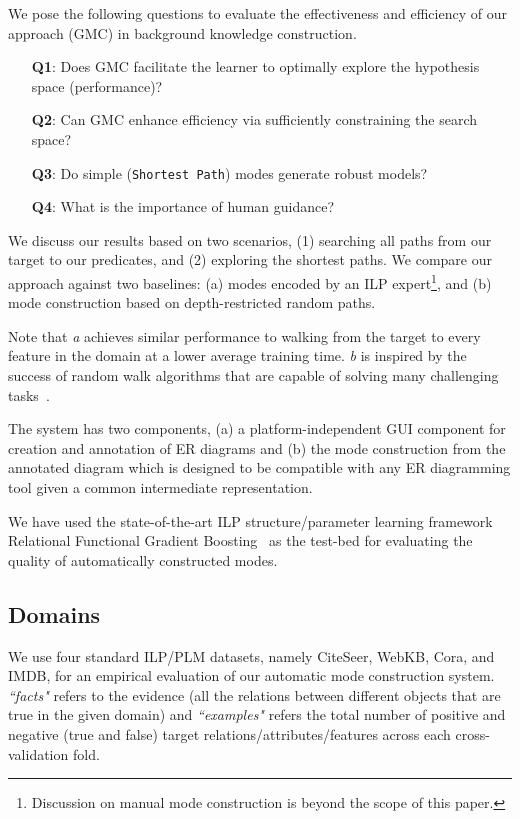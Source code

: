 \documentclass[sigconf]{acmart}
\begin{document}
We pose the following questions to evaluate the effectiveness and efficiency of our approach (\textsc{GMC}) in background knowledge construction.
\begin{enumerate}
\item[\textbf{Q1}:] Does \textsc{GMC} facilitate the learner to optimally explore the hypothesis space (performance)?
\item[\textbf{Q2}:] Can \textsc{GMC} enhance efficiency via sufficiently constraining the search space?
\item[\textbf{Q3}:] Do simple (\texttt{Shortest Path}) modes generate robust models?
\item[\textbf{Q4}:] {What is the importance of human guidance?}
\end{enumerate}

We discuss our results based on two scenarios, (1) searching all paths from our target to our predicates, and (2) exploring the shortest paths. We compare our approach against two baselines: (a) modes encoded by an ILP expert\footnote{Discussion on manual mode construction is beyond the scope of this paper.},
and (b) mode construction based on depth-restricted random paths.

Note that \textit{a} achieves similar performance to walking from the target to every feature in the domain at a lower average training time. \textit{b} is inspired by the success of random walk algorithms that are capable of solving many challenging tasks~\cite{PRA}.

The system has two components, (a) a platform-independent GUI component for creation and annotation of ER diagrams and (b) the mode construction from the annotated diagram which is designed to be compatible with any ER diagramming tool given a common intermediate representation.

We have used the state-of-the-art ILP structure/parameter learning framework Relational Functional Gradient Boosting~\cite{natarajan10} as the test-bed for evaluating the quality of automatically constructed modes.

\subsection{Domains}

We use four standard ILP/PLM datasets, namely CiteSeer, WebKB, Cora, and IMDB, for an empirical evaluation of our automatic mode construction system. \textit{``facts"} refers to the evidence (all the relations between different objects that are true in the given domain) and \textit{``examples"} refers the total number of positive and negative (true and false) target relations/attributes/features across each cross-validation fold.
\end{document}
